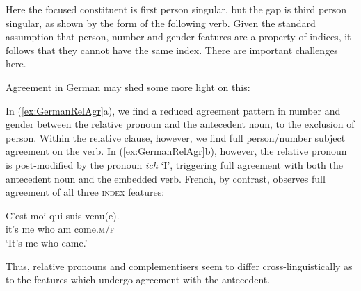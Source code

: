 \documentclass[output=paper
	        ,collection
	        ,collectionchapter
 	        ,biblatex
                ,babelshorthands
                ,newtxmath
                ,draftmode
                ,colorlinks, citecolor=brown
]{langscibook}
\begin{document}
{\noindent
Here the focused constituent is first person singular, but the gap is
third person singular, as shown by the form of the following verb. Given
the standard assumption that person, number and gender features are a
property of indices, it follows that they cannot have the same index.
There are important challenges here.

Agreement in German may shed some more light on this: 

\begin{exe}
\ex \label{ex:GermanRelAgr}
\begin{xlist}
\end{xlist}
\end{exe}

\noindent 
In (\ref{ex:GermanRelAgr}a), we find a reduced agreement pattern in
number and gender between the relative pronoun and the antecedent
noun, to the exclusion of person. Within the relative clause, however, we find full person/number subject agreement on the verb. In (\ref{ex:GermanRelAgr}b), however, the relative pronoun is post-modified by the pronoun \textit{ich} `I', triggering full  agreement with both the antecedent noun and the embedded verb. 
French, by contrast, observes full agreement of all three \textsc{index} features: 

\begin{exe}
 \ex \label{ex:FrenchRelSAgr} \gll C'est moi qui suis venu(e).\\
  it's me who am come.\textsc{m/f}\\
\glt `It's me who came.' 
\end{exe}
 
\noindent
Thus, relative pronouns and complementisers seem to differ cross-linguistically as to the features which undergo agreement with the antecedent.  

}
\end{document}
